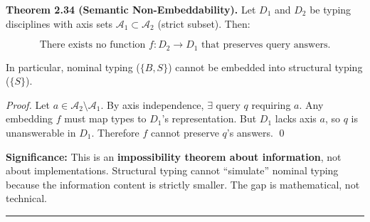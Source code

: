 \textbf{Theorem 2.34 (Semantic Non-Embeddability).} Let \(D_1\) and \(D_2\) be typing disciplines with axis sets \(\mathcal{A}_1 \subset \mathcal{A}_2\) (strict subset). Then:

\[\text{There exists no function } f : D_2 \to D_1 \text{ that preserves query answers.}\]

In particular, nominal typing (\(\{B, S\}\)) cannot be embedded into structural typing (\(\{S\}\)).

\emph{Proof.} Let \(a \in \mathcal{A}_2 \setminus \mathcal{A}_1\). By axis independence, \(\exists\) query \(q\) requiring \(a\). Any embedding \(f\) must map types to \(D_1\)'s representation. But \(D_1\) lacks axis \(a\), so \(q\) is unanswerable in \(D_1\). Therefore \(f\) cannot preserve \(q\)'s answers. \qed

\textbf{Significance:} This is an \textbf{impossibility theorem about information}, not about implementations. Structural typing cannot ``simulate'' nominal typing because the information content is strictly smaller. The gap is mathematical, not technical.

\begin{center}\rule{0.5\linewidth}{0.5pt}\end{center}
